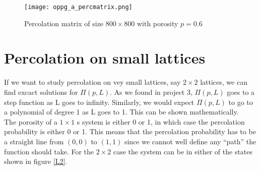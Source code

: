 \documentclass[a4paper,english, 10pt, twoside]{article}
\begin{document}
\begin{figure}[H]
\centering
\texttt{[image: oppg\_a\_percmatrix.png]}
\caption{Percolation matrix of size $800\times800$ with porosity $p=0.6$}
\label{perc_matrix}
\end{figure}

\section{Percolation on small lattices}
If we want to study percolation on vey small lattices, say $2\times2$ lattices, we can find excact solutions for $\Pi(p,L)$. As we found 
in project 3, $\Pi(p,L)$ goes to a step function as L goes to infinity. Similarly, we would expect $\Pi(p,L)$ to go to a polynomial of 
degree 1 as L goes to 1. This can be shown mathematically.\\
The porosity of a $1\times1$ s system is either 0 or 1, in which case the percolation probability is either 0 or 1. This means that the 
percolation probability has to be a straight line from $(0,0)$ to $(1,1)$ since we cannot well define any ``path'' the function should take.
For the $2\times2$ case the system can be in either of the states shown in figure \ref{L2}.
\end{document}
